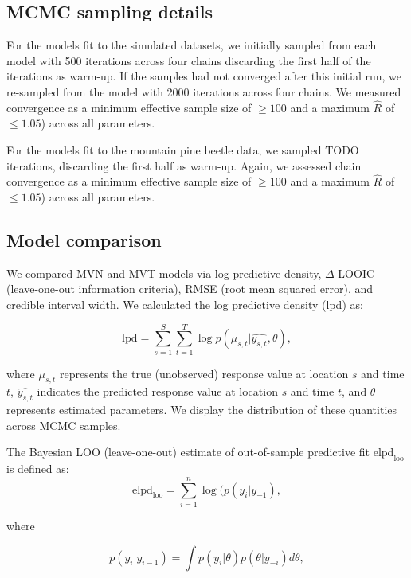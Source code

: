 \documentclass[12pt,english]{article}
\begin{document}
\begin{spacing}{1.4}
\subsection{MCMC sampling details}

For the models fit to the simulated datasets, we initially sampled from each
model with 500 iterations across four chains discarding the first half of the
iterations as warm-up. If the samples had not converged after this initial run,
we re-sampled from the model with 2000 iterations across four chains. We
measured convergence as a minimum effective sample size of $\ge 100$ and a
maximum $\hat{R}$ of $\le 1.05$) across all parameters.

For the models fit to the mountain pine beetle data, we sampled TODO iterations,
discarding the first half as warm-up. Again, we assessed chain convergence as a
minimum effective sample size of $\ge 100$ and a maximum $\hat{R}$ of $\le
1.05$) across all parameters.

\subsection{Model comparison}

We compared MVN and MVT models via log predictive density, $\Delta$ LOOIC
(leave-one-out information criteria), RMSE (root mean squared error), and
credible interval width. We calculated the log predictive density (lpd) as:

\begin{equation}
  \mathrm{lpd} = \sum^{S}_{s=1}{ \sum^{T}_{t=1}{ \log  p(\mu_{s,t} | \widehat{y_{s,t}}, \theta)}},
\end{equation}

\noindent where $\mu_{s,t}$ represents the true (unobserved) response value at
location $s$ and time $t$, $\widehat{y_{s,t}}$ indicates the predicted
response value at location $s$ and time $t$, and $\theta$ represents estimated
parameters. We display the distribution of these quantities across MCMC
samples.

The Bayesian LOO (leave-one-out) estimate of out-of-sample
predictive fit $\mathrm{elpd}_\mathrm{loo}$ is defined as:
\begin{equation}
  \mathrm{elpd}_\mathrm{loo} = \sum^{n}_{i=1}{\log ( p(y_i | y_{-1}) },
\end{equation}

\noindent where

\begin{equation}
  p(y_i | y_{i-1}) = \int p(y_i | \theta) p (\theta | y_{-i}) d \theta ,
\end{equation}


\end{spacing}
\end{document}

